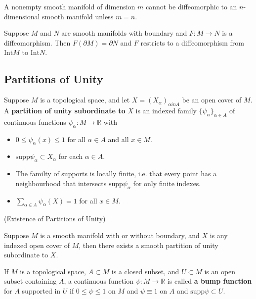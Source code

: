 \begin{theorem}
    A nonempty smooth manifold of dimension $m$ cannot be diffeomorphic to an $n$-dimensional smooth manifold unless $m=n$.
\end{theorem}

\begin{theorem}
    Suppose $M$ and $N$ are smooth manifolds with boundary and $F:M\to N$ is a diffeomorphism. Then $F(\partial M) = \partial N$ and $F$ restricts to a diffeomorphism from $\text{Int} M$ to $\text{Int} N$.
\end{theorem}

\subsection{Partitions of Unity}

\begin{definition}
    Suppose $M$ is a topological space, and let $X = (X_{\alpha})_{\alpha in A}$ be an open cover of $M$. A \textbf{partition of unity subordinate to }$X$ is an indexed family $\{\psi_{\alpha}\}_{\alpha \in A}$ of continuous functions $\psi_{\alpha}:M\to\mathbb{R}$ with
    \begin{itemize}
        \item $0\leq \psi_{\alpha}(x)\leq 1$ for all $\alpha \in A$ and all $x\in M$.
        \item $\text{supp}\psi_{\alpha} \subset X_{\alpha}$ for each $\alpha \in A$.
        \item The familty of supports is locally finite, i.e. that every point has a neighbourhood that intersects $\text{supp} \psi_{\alpha}$ for only finite indexes.
        \item $\sum\limits_{\alpha\in A} \psi_{\alpha}(X) = 1$ for all $x\in M$.
    \end{itemize}
\end{definition}

\begin{theorem}(Existence of Partitions of Unity)\par
    Suppose $M$ is a smooth manifold with or without boundary, and $X$ is any indexed open cover of $M$, then there exists a smooth partition of unity subordinate to $X$.
\end{theorem}

\begin{definition}
    If $M$ is a topological space, $A\subset M$ is a closed subset, and $U\subset M$ is an open subset containing $A$, a continuous function $\psi: M\to \mathbb{R}$ is called \textbf{a bump function} for $A$ supported in $U$ if $0\leq \psi \leq 1$ on $M$ and $\psi \equiv 1 $ on $A$ and $\text{supp} \psi \subset U$.
\end{definition}


